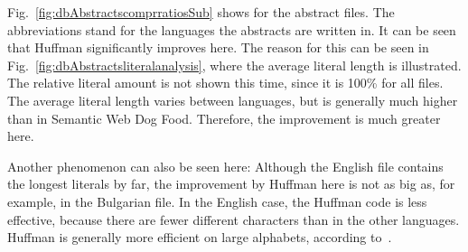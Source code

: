 Fig.~\ref{fig:dbAbstractscomprratiosSub} shows  for the abstract files. The abbreviations stand for the languages the abstracts are written in. It can be seen that Huffman significantly improves  here. The reason for this can be seen in Fig.~\ref{fig:dbAbstractsliteralanalysis}, where the average literal length is illustrated. The relative literal amount is not shown this time, since it is 100\% for all files. The average literal length varies between languages, but is generally much higher than in Semantic Web Dog Food. Therefore, the improvement is much greater here.

Another phenomenon can also be seen here: Although the English file contains the longest literals by far, the improvement by Huffman here is not as big as, for example, in the Bulgarian file. In the English case, the Huffman code is less effective, because there are fewer different characters than in the other languages. Huffman is generally more efficient on large alphabets, according to~\cite{huffman}.

